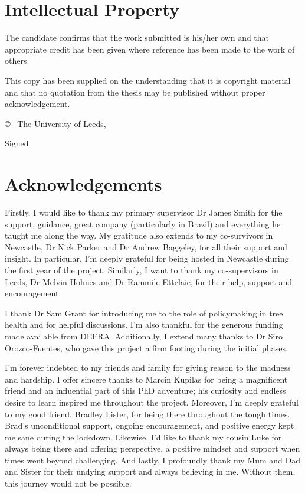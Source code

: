 \chapter*{Intellectual Property}
The candidate confirms that the work submitted is his/her own and that appropriate credit has been given where reference has been made to the work of others.

This copy has been supplied on the understanding that it is copyright material and that no quotation from the thesis may be published without proper acknowledgement.

© \submissionyear\ The University of Leeds, \name

\vspace{2cm}
Signed 

\chapter*{Acknowledgements}
Firstly, I would like to thank my primary supervisor Dr James Smith for the support, guidance, great company (particularly in Brazil) and everything he taught me along the way. 
My gratitude also extends to my co-survivors in Newcastle, Dr Nick Parker and Dr Andrew Baggeley, for all their support and insight. 
In particular, I'm deeply grateful for being hosted in Newcastle during the first year of the project.
Similarly, I want to thank my co-supervisors in Leeds, Dr Melvin Holmes and Dr Rammile Ettelaie, for their help, support and encouragement. 

I thank Dr Sam Grant for introducing me to the role of policymaking in tree health and for helpful discussions. I'm also thankful for the generous funding made available from DEFRA. 
Additionally, I extend many thanks to Dr Siro Orozco-Fuentes, who gave this project a firm footing during the initial phases.

I'm forever indebted to my friends and family for giving reason to the madness and hardship. 
I offer sincere thanks to Marcin Kupilas for being a magnificent friend and an influential part of this PhD adventure; his curiosity and endless desire to learn inspired me throughout the project.
Moreover, I'm deeply grateful to my good friend, Bradley Lister, for being there throughout the tough times. Brad's unconditional support, ongoing encouragement, and positive energy kept me sane during the lockdown. 
Likewise, I'd like to thank my cousin Luke for always being there and offering perspective, a positive mindset and support when times went beyond challenging.
And lastly, I profoundly thank my Mum and Dad and Sister for their undying support and always believing in me. Without them, this journey would not be possible.


